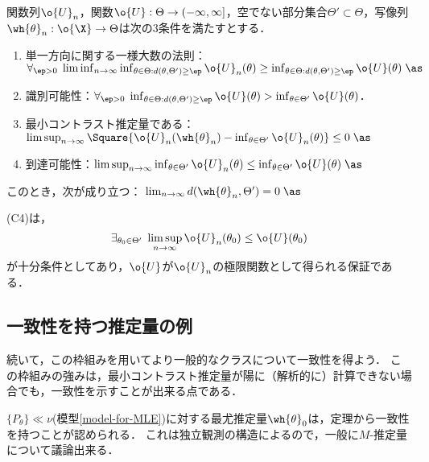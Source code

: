 \documentclass[uplatex,dvipdfmx]{jsreport}
\begin{document}
\begin{theorem}[最小コントラスト推定量の強一致性の十分条件]\label{thm-C-strong-consistency}
    関数列$\o{U}_n$，関数$\o{U}:\Theta\to(-\infty,\infty]$，空でない部分集合$\Theta'\subset\Theta$，写像列$\wh{\theta}_n:\o{\X}\to\Theta$は次の3条件を満たすとする．
    \begin{enumerate}[({C}1)]
        \item 単一方向に関する一様大数の法則：$\forall_{\ep>0}\;\liminf_{n\to\infty}\inf_{\theta\in\Theta:d(\theta,\Theta')\ge\ep}\o{U}_n(\theta)\ge\inf_{\theta\in\Theta:d(\theta,\Theta')\ge\ep}\o{U}(\theta)\;\as$
        \item 識別可能性：$\forall_{\ep>0}\;\inf_{\theta\in\Theta:d(\theta,\Theta')\ge\ep}\o{U}(\theta)>\inf_{\theta\in\Theta'}\o{U}(\theta)$．
        \item 最小コントラスト推定量である：$\limsup_{n\to\infty}\Square{\o{U}_n(\wh{\theta}_n)-\inf_{\theta\in\Theta'}\o{U}_n(\theta)}\le0\;\as$
        \item 到達可能性：$\limsup_{n\to\infty}\inf_{\theta\in\Theta'}\o{U}_n(\theta)\le\inf_{\theta\in\Theta'}\o{U}(\theta)\;\as$
    \end{enumerate}
    このとき，次が成り立つ：
    $\lim_{n\to\infty}d(\wh{\theta}_n,\Theta')=0\;\as$
\end{theorem}
\begin{remarks}
    (C4)は，
    \[\exists_{\theta_0\in\Theta'}\;\limsup_{n\to\infty}\o{U}_n(\theta_0)\le\o{U}(\theta_0)\]
    が十分条件としてあり，$\o{U}$が$\o{U}_n$の極限関数として得られる保証である．
\end{remarks}

\subsection{一致性を持つ推定量の例}

\begin{tcolorbox}[colframe=ForestGreen, colback=ForestGreen!10!white,breakable,colbacktitle=ForestGreen!40!white,coltitle=black,fonttitle=\bfseries\sffamily,
title=]
続いて，この枠組みを用いてより一般的なクラスについて一致性を得よう．
この枠組みの強みは，最小コントラスト推定量が陽に（解析的に）計算できない場合でも，一致性を示すことが出来る点である．
\end{tcolorbox}

\begin{example}[最尤推定量]
    $\{P_\theta\}\ll\nu$(模型\ref{model-for-MLE})に対する最尤推定量$\wh{\theta}_0$は，定理から一致性を持つことが認められる．
    これは独立観測の構造によるので，一般に$M$-推定量について議論出来る．
\end{example}
\end{document}
